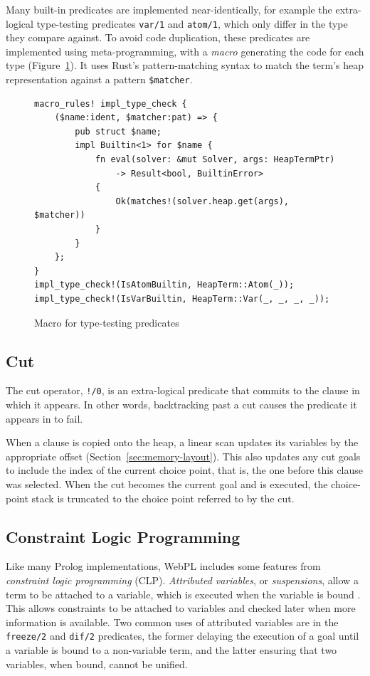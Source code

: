 Many built-in predicates are implemented near-identically, for example the extra-logical type-testing predicates \texttt{var/1} and \texttt{atom/1}, which only differ in the type they compare against. To avoid code duplication, these predicates are implemented using meta-programming, with a \emph{macro} generating the code for each type (Figure~\ref{fig:builtin-macro}). It uses Rust's pattern-matching syntax to match the term's heap representation against a pattern \texttt{\$matcher}.

\begin{figure}[H]
\centering
\begin{verbatim}
macro_rules! impl_type_check {
    ($name:ident, $matcher:pat) => {
        pub struct $name;
        impl Builtin<1> for $name {
            fn eval(solver: &mut Solver, args: HeapTermPtr)
                -> Result<bool, BuiltinError>
            {
                Ok(matches!(solver.heap.get(args), $matcher))
            }
        }
    };
}
impl_type_check!(IsAtomBuiltin, HeapTerm::Atom(_));
impl_type_check!(IsVarBuiltin, HeapTerm::Var(_, _, _, _));
\end{verbatim}
\caption{Macro for type-testing predicates}
\label{fig:builtin-macro}
\end{figure}

\subsection{Cut}

The cut operator, \texttt{!/0}, is an extra-logical predicate that commits to the clause in which it appears. In other words, backtracking past a cut causes the predicate it appears in to fail.

When a clause is copied onto the heap, a linear scan updates its variables by the appropriate offset (Section~\ref{sec:memory-layout}). This also updates any cut goals to include the index of the current choice point, that is, the one before this clause was selected. When the cut becomes the current goal and is executed, the choice-point stack is truncated to the choice point referred to by the cut.

\subsection{Constraint Logic Programming}

\label{sec:attributed-variables}

Like many Prolog implementations, WebPL includes some features from \emph{constraint logic programming} (CLP). \emph{Attributed variables}, or \emph{suspensions}, allow a term to be attached to a variable, which is executed when the variable is bound \cite{holzbaurMetastructuresvsattributed1992}. This allows constraints to be attached to variables and checked later when more information is available. Two common uses of attributed variables are in the \texttt{freeze/2} and \texttt{dif/2} predicates, the former delaying the execution of a goal until a variable is bound to a non-variable term, and the latter ensuring that two variables, when bound, cannot be unified.

